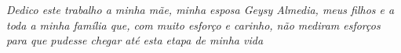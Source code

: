 \begin{dedicatoria}
   \vspace*{\fill}
   \centering
   \noindent
   \textit{Dedico este trabalho a minha mãe, minha esposa Geysy Almedia, meus filhos e a toda a minha família que, com muito esforço e carinho, não mediram esforços para que pudesse chegar até esta etapa de minha vida} \vspace*{\fill}
\end{dedicatoria}

